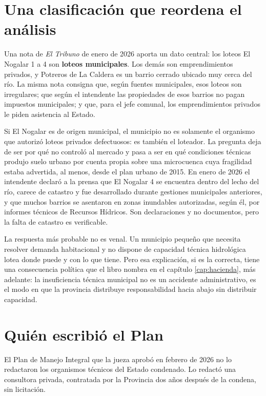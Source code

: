 \section{Una clasificación que reordena el análisis}

Una nota de \textit{El Tribuno} de enero de 2026 aporta un dato central: los loteos El Nogalar 1 a 4 son \textbf{loteos municipales}. Los demás son emprendimientos privados, y Potreros de La Caldera es un barrio cerrado ubicado muy cerca del río. La misma nota consigna que, según fuentes municipales, esos loteos son irregulares; que según el intendente las propiedades de esos barrios no pagan impuestos municipales; y que, para el jefe comunal, los emprendimientos privados le piden asistencia al Estado.

Si El Nogalar es de origen municipal, el municipio no es solamente el organismo que autorizó loteos privados defectuosos: es también el loteador. La pregunta deja de ser por qué no controló al mercado y pasa a ser en qué condiciones técnicas produjo suelo urbano por cuenta propia sobre una microcuenca cuya fragilidad estaba advertida, al menos, desde el plan urbano de 2015. En enero de 2026 el intendente declaró a la prensa que El Nogalar 4 se encuentra dentro del lecho del río, carece de catastro y fue desarrollado durante gestiones municipales anteriores, y que muchos barrios se asentaron en zonas inundables autorizadas, según él, por informes técnicos de Recursos Hídricos. Son declaraciones y no documentos, pero la falta de catastro es verificable.

La respuesta más probable no es venal. Un municipio pequeño que necesita resolver demanda habitacional y no dispone de capacidad técnica hidrológica lotea donde puede y con lo que tiene. Pero esa explicación, si es la correcta, tiene una consecuencia política que el libro nombra en el capítulo \ref{cap:hacienda}, más adelante: la insuficiencia técnica municipal no es un accidente administrativo, es el modo en que la provincia distribuye responsabilidad hacia abajo sin distribuir capacidad.

\section{Quién escribió el Plan}
El Plan de Manejo Integral que la jueza aprobó en febrero de 2026 no lo redactaron los organismos técnicos del Estado condenado. Lo redactó una consultora privada, contratada por la Provincia dos años después de la condena, sin licitación.

